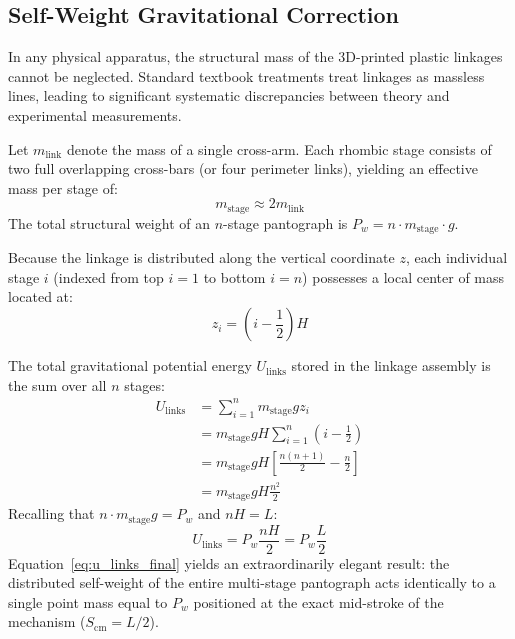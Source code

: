 \documentclass[10pt,twocolumn]{article}
\begin{document}
\subsection{Self-Weight Gravitational Correction}

In any physical apparatus, the structural mass of the 3D-printed plastic linkages cannot be neglected. Standard textbook treatments treat linkages as massless lines, leading to significant systematic discrepancies between theory and experimental measurements.

Let $m_{\mathrm{link}}$ denote the mass of a single cross-arm. Each rhombic stage consists of two full overlapping cross-bars (or four perimeter links), yielding an effective mass per stage of:
\begin{equation}
    m_{\mathrm{stage}} \approx 2 m_{\mathrm{link}}
\end{equation}
The total structural weight of an $n$-stage pantograph is $P_w = n \cdot m_{\mathrm{stage}} \cdot g$.

Because the linkage is distributed along the vertical coordinate $z$, each individual stage $i$ (indexed from top $i=1$ to bottom $i=n$) possesses a local center of mass located at:
\begin{equation}
    z_i = \left( i - \frac{1}{2} \right) H
\end{equation}

The total gravitational potential energy $U_{\mathrm{links}}$ stored in the linkage assembly is the sum over all $n$ stages:
\begin{align}
    U_{\mathrm{links}} &= \sum_{i=1}^n m_{\mathrm{stage}} g z_i \nonumber \\
    &= m_{\mathrm{stage}} g H \sum_{i=1}^n \left( i - \frac{1}{2} \right) \nonumber \\
    &= m_{\mathrm{stage}} g H \left[ \frac{n(n+1)}{2} - \frac{n}{2} \right] \nonumber \\
    &= m_{\mathrm{stage}} g H \frac{n^2}{2}
    \label{eq:u_links_sum}
\end{align}
Recalling that $n \cdot m_{\mathrm{stage}} g = P_w$ and $n H = L$:
\begin{equation}
    U_{\mathrm{links}} = P_w \frac{n H}{2} = P_w \frac{L}{2}
    \label{eq:u_links_final}
\end{equation}
Equation~\eqref{eq:u_links_final} yields an extraordinarily elegant result: the distributed self-weight of the entire multi-stage pantograph acts identically to a single point mass equal to $P_w$ positioned at the exact mid-stroke of the mechanism ($S_{\mathrm{cm}} = L/2$).
\end{document}
